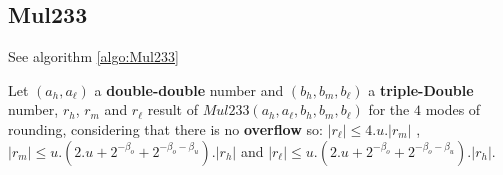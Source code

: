 \subsection{Mul233 }
See algorithm \ref{algo:Mul233}

\begin{lem}[Mul233] Let $(a_h,a_{\ell})$ a \textbf{double-double} number and $(b_h, b_m, b_{\ell})$ a   \textbf{triple-Double} number, $r_h$, $r_m$ and  $r_{\ell}$ result of $Mul233(a_h,a_{\ell},b_h,b_m,b_{\ell})$ for the $4$ modes of rounding, considering that there is no \textbf{overflow} so: $ \lvert r_{\ell} \rvert \le 4.u. \lvert r_m \rvert$ , $\lvert r_m \rvert \le u.(2.u + 2^{-\beta_o} +2^{-\beta_o -\beta_u}). \lvert r_h \rvert$ and $\lvert r_{\ell} \rvert \le u.(2.u + 2^{-\beta_o} +2^{-\beta_o -\beta_u}). \lvert r_h \rvert$.
\end{lem}

